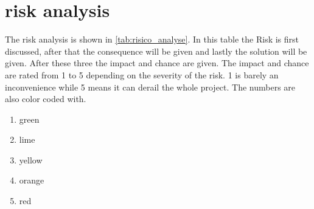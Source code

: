 \newpage

\thispagestyle{empty}
\section{risk analysis}
The risk analysis is shown in \autoref{tab:risico_analyse}. In this table the Risk is first discussed, after that the consequence will be given and lastly the solution will be given. After these three the impact and chance are given. The impact and chance are rated from 1 to 5 depending on the severity of the risk. 1 is barely an inconvenience while 5 means it can derail the whole project. The numbers are also color coded with.

\begin{enumerate}
\item green
\item lime
\item yellow
\item orange
\item red
\end{enumerate}

\setcounter{riskTableCounter}{1}

